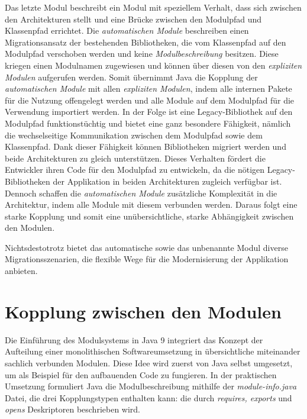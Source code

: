     Das letzte Modul beschreibt ein Modul mit speziellem Verhalt, dass sich zwischen den Architekturen stellt und eine Brücke zwischen den Modulpfad und Klassenpfad errichtet. Die \textit{automatischen Module} beschreiben einen Migrationsansatz der bestehenden Bibliotheken, die vom Klassenpfad auf den Modulpfad verschoben werden und keine \textit{Modulbeschreibung} besitzen. Diese kriegen einen Modulnamen zugewiesen und können über diesen von den \textit{expliziten Modulen} aufgerufen werden. Somit übernimmt Java die Kopplung der \textit{automatischen Module} mit allen \textit{expliziten Modulen}, indem alle internen Pakete für die Nutzung offengelegt werden und alle Module auf dem Modulpfad für die Verwendung importiert werden. In der Folge ist eine Legacy-Bibliothek auf den Modulpfad funktionstüchtig und bietet eine ganz besondere Fähigkeit, nämlich die wechselseitige Kommunikation zwischen dem Modulpfad sowie dem Klassenpfad. Dank dieser Fähigkeit können Bibliotheken migriert werden und beide Architekturen zu gleich unterstützen. Dieses Verhalten fördert die Entwickler ihren Code für den Modulpfad zu entwickeln, da die nötigen Legacy-Bibliotheken der Applikation in beiden Architekturen zugleich verfügbar ist.\newline 
    Dennoch schaffen die \textit{automatischen Module} zusätzliche Komplexität in die Architektur, indem alle Module mit diesem verbunden werden. Daraus folgt eine starke Kopplung und somit eine unübersichtliche, starke Abhängigkeit zwischen den Modulen.\cite{modulMitJava9,java9modRevealed,modulProgJava9}\bigbreak

    Nichtsdestotrotz bietet das automatische sowie das unbenannte Modul diverse Migrationsszenarien, die flexible Wege für die Modernisierung der Applikation anbieten. 

  \section{Kopplung zwischen den Modulen} \label{sec:mod_kop}
    Die Einführung des Modulsystems in Java 9 integriert das Konzept der Aufteilung einer monolithischen Softwareumsetzung in übersichtliche miteinander sachlich verbunden Modulen. Diese Idee wird zuerst von Java selbst umgesetzt, um als Beispiel für den aufbauenden Code zu fungieren. In der praktischen Umsetzung formuliert Java die Modulbeschreibung mithilfe der \textit{module-info.java} Datei, die drei Kopplungstypen enthalten kann: die durch \textit{requires, exports} und \textit{opens} Deskriptoren beschrieben wird.

